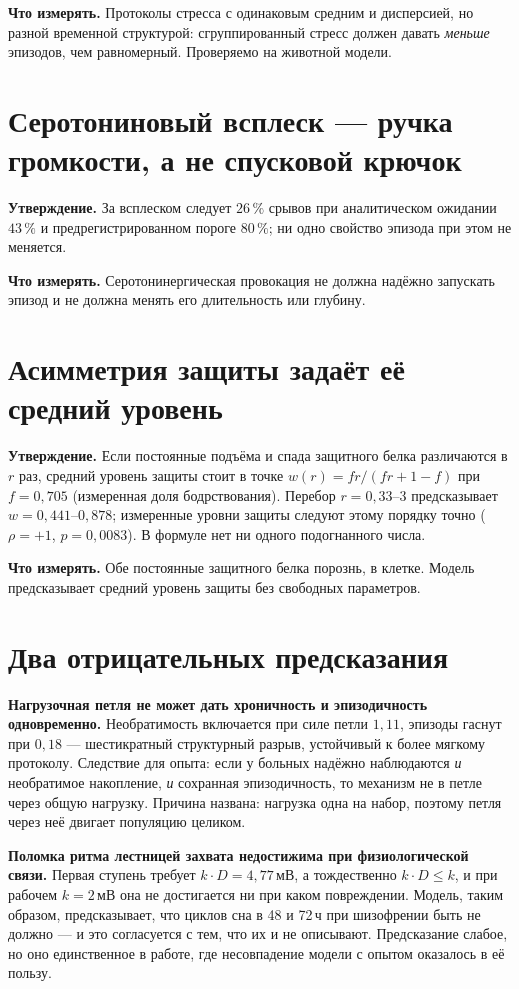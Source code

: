 \documentclass[11pt,a4paper]{article}
\begin{document}
\textbf{Что измерять.} Протоколы стресса с одинаковым средним и дисперсией, но разной временной
структурой: сгруппированный стресс должен давать \emph{меньше} эпизодов, чем равномерный.
Проверяемо на животной модели.

\section{Серотониновый всплеск --- ручка громкости, а не спусковой крючок}
\textbf{Утверждение.} За всплеском следует $26\,\%$ срывов при аналитическом ожидании $43\,\%$ и
предрегистрированном пороге $80\,\%$; ни одно свойство эпизода при этом не меняется.

\textbf{Что измерять.} Серотонинергическая провокация не должна надёжно запускать эпизод и не должна
менять его длительность или глубину.

\section{Асимметрия защиты задаёт её средний уровень}
\textbf{Утверждение.} Если постоянные подъёма и спада защитного белка различаются в $r$ раз, средний
уровень защиты стоит в точке $w(r)=fr/(fr+1-f)$ при $f=0{,}705$ (измеренная доля бодрствования).
Перебор $r=0{,}33$--$3$ предсказывает $w=0{,}441$--$0{,}878$; измеренные уровни защиты следуют этому
порядку точно ($\rho=+1$, $p=0{,}0083$). В формуле нет ни одного подогнанного числа.

\textbf{Что измерять.} Обе постоянные защитного белка порознь, в клетке. Модель предсказывает
средний уровень защиты без свободных параметров.

\section{Два отрицательных предсказания}
\textbf{Нагрузочная петля не может дать хроничность и эпизодичность одновременно.} Необратимость
включается при силе петли $1{,}11$, эпизоды гаснут при $0{,}18$ --- шестикратный структурный разрыв,
устойчивый к более мягкому протоколу. Следствие для опыта: если у больных надёжно наблюдаются
\emph{и} необратимое накопление, \emph{и} сохранная эпизодичность, то механизм не в петле через
общую нагрузку. Причина названа: нагрузка одна на набор, поэтому петля через неё двигает популяцию
целиком.

\textbf{Поломка ритма лестницей захвата недостижима при физиологической связи.} Первая ступень
требует $k\!\cdot\!D=4{,}77$\,мВ, а тождественно $k\!\cdot\!D\le k$, и при рабочем $k=2$\,мВ она не
достигается ни при каком повреждении. Модель, таким образом, предсказывает, что циклов сна в 48 и
72\,ч при шизофрении быть не должно --- и это согласуется с тем, что их и не описывают. Предсказание
слабое, но оно единственное в работе, где несовпадение модели с опытом оказалось в её пользу.
\end{document}
